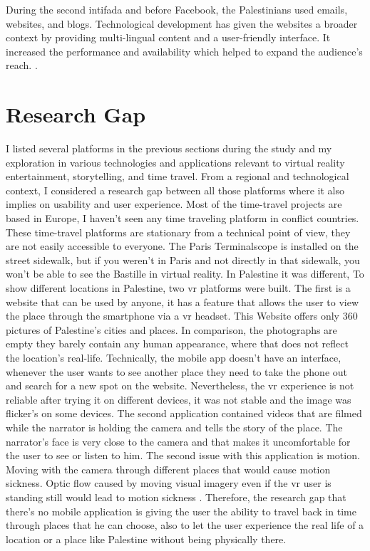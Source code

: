 During the second intifada and before Facebook, the Palestinians used emails, websites, and blogs. Technological development has given the websites a broader context by providing multi-lingual content and a user-friendly interface. It increased the performance and availability which helped to expand the audience's reach. \citep{Aouragh2011}. 

\section{Research Gap}

I listed several platforms in the previous sections during the study and my exploration in various technologies and applications relevant to virtual reality entertainment, storytelling, and time travel. From a regional and technological context, I considered a research gap between all those platforms where it also implies on usability and user experience. Most of the time-travel projects are based in Europe, I haven't seen any time traveling platform in conflict countries. These time-travel platforms are stationary from a technical point of view, they are not easily accessible to everyone. The Paris Terminalscope is installed on the street sidewalk, but if you weren't in Paris and not directly in that sidewalk, you won't be able to see the Bastille in virtual reality. In Palestine it was different, To show different locations in Palestine, two \acrshort{vr} platforms were built. The first is a website that can be used by anyone, it has a feature that allows the user to view the place through the smartphone via a \acrshort{vr} headset. This Website offers only 360 pictures of Palestine's cities and places. In comparison, the photographs are empty they barely contain any human appearance, where that does not reflect the location's real-life. Technically, the mobile app doesn't have an interface, whenever the user wants to see another place they need to take the phone out and search for a new spot on the website. Nevertheless, the \acrshort{vr} experience is not reliable after trying it on different devices, it was not stable and the image was flicker's on some devices. The second application contained videos that are filmed while the narrator is holding the camera and tells the story of the place. The narrator's face is very close to the camera and that makes it uncomfortable for the user to see or listen to him. The second issue with this application is motion. Moving with the camera through different places that would cause motion sickness. Optic flow caused by moving visual imagery even if the \acrshort{vr} user is standing still would lead to motion sickness \citep{Steinicke2016}. Therefore, the research gap that there's no mobile application is giving the user the ability to travel back in time through places that he can choose, also to let the user experience the real life of a location or a place like Palestine without being physically there.  